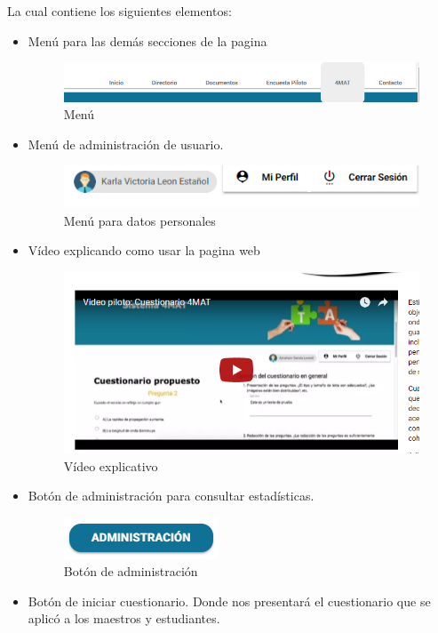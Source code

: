 La cual contiene los siguientes elementos:
	\begin{itemize}
		\item Menú para las demás secciones de la pagina
			\begin{figure}[hbtp]
		
			\includegraphics[scale=0.6]{images/Interfaz/IUGS01_menu.png}
			\caption{Menú}
		\end{figure}
		\item Menú de administración de usuario.
			\begin{figure}[hbtp]
		
			\includegraphics[scale=0.6]{images/Interfaz/IUGS01_menuadmin.png}
			\caption{Menú para datos personales}
		\end{figure}
		
		\item Vídeo explicando como usar la pagina web
		 \begin{figure}[hbtp]
		
			\includegraphics[scale=0.6]{images/Interfaz/IUGS01_video.png}
			\caption{Vídeo explicativo}
		\end{figure}
		\item Botón de administración para consultar estadísticas.
			 \begin{figure}[hbtp]
		
			\includegraphics[scale=0.6]{images/Interfaz/IUGS01_botonadmin.png}
			\caption{Botón de administración}
		\end{figure}
		\item Botón de iniciar cuestionario. Donde nos presentará el
		cuestionario que se aplicó a los maestros y estudiantes.
		
		
	\end{itemize}
	
	